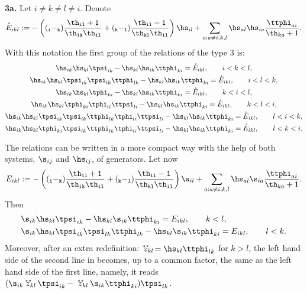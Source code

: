 {\bf 3a.} Let $i\neq k\neq l\neq i$. Denote
\begin{gather*}
\mathring{E}_{ikl}:=-\left((\tt_i-\tt_k) \frac{\th_{il}+1}{\th_{ik}\th_{il}}+(\tt_k-\tt_l) \frac{\th_{il}-1}{\th_{kl}\th_{il}}\right)\hs_{il}+\sum_{a:a\neq i,k,l}
\hs_{al}\hs_{ia} \frac{\ttphi_{ai}}{\th_{ka}+1} .
\end{gather*}
With this notation the f\/irst group of the relations of the type 3 is:
\begin{gather}\notag\hs_{ik}\hs_{kl}\tpsi_{ik} -\hs_{kl}\hs_{ik}\ttphi_{ki}
=\mathring{E}_{ikl} , \qquad i<k<l ,\\   \notag
\hs_{ik}\hs_{kl}\tpsi_{ik}\tpsi_{lk}\ttphi_{lk} -\hs_{kl}\hs_{ik}\ttphi_{ki}
=\mathring{E}_{ikl}  , \qquad i<l<k ,\\
\label{relation3}
\hs_{ik}\hs_{kl}\tphi_{ki} -\hs_{kl}\hs_{ik}\ttphi_{ki}=\mathring{E}_{ikl} , \qquad  k<i<l ,\\
\notag \hs_{ik}\hs_{kl}\tphi_{ki}\tphi_{li}\ttpsi_{li} -\hs_{kl}\hs_{ik}\ttphi_{ki}
=\mathring{E}_{ikl}  ,\qquad  k<l<i ,\\
\notag \hs_{ik}\hs_{kl}\tpsi_{ik}\tpsi_{lk}\ttphi_{lk}\tphi_{li}\ttpsi_{li}-\hs_{kl}\hs_{ik}\ttphi_{ki}
 =\mathring{E}_{ikl}  , \qquad l<i<k , \\  \notag
\hs_{ik}\hs_{kl}\tphi_{ki}\tpsi_{lk}\ttphi_{lk}\tphi_{li}\ttpsi_{li}
-\hs_{kl}\hs_{ik}\ttphi_{ki}=\mathring{E}_{ikl} , \qquad l<k<i .
\end{gather}

The relations  can be written in a more compact way with the help of both systems, $\s_{ij}$ and $\hs_{ij}$, of generators. Let now
\begin{gather*}
E_{ikl}:=-\left((\tt_i-\tt_k) \frac{\th_{il}+1}{\th_{ik}\th_{il}}+(\tt_k-\tt_l) \frac{\th_{il}-1}{\th_{kl}\th_{il}}\right)
\s_{il}+\sum_{a:a\neq i,k,l}
\hs_{al}\s_{ia} \frac{\ttphi_{ai}}{\th_{ka}+1} .
\end{gather*}
Then
\begin{gather}
\begin{split}
& \s_{ik}\hs_{kl}\tpsi_{ik} -\hs_{kl}\s_{ik}\ttphi_{ki}=E_{ikl} ,\qquad k<l,\\ %
& \s_{ik}\hs_{kl}\tpsi_{ik}\tpsi_{lk}\ttphi_{lk} -\hs_{kl}\s_{ik}\ttphi_{ki}=E_{ikl} ,\qquad l<k .
\end{split}
\label{shfo3a}
\end{gather}
Moreover, after an extra redef\/inition: $\!\mathring{\hspace{.1cm}z}_{kl}\!\!\!\!\!\!\mathring{\phantom{z}}\ =\hs_{kl}\ttphi_{lk}$ for $k>l$, the left hand side of the
second line in  becomes, up to a common factor, the same as the left hand side of the f\/irst line, namely, it reads $(\s_{ik}
\mathring{\hspace{.1cm}z}_{kl}\!\!\!\!\!\!\mathring{\phantom{z}}\ \ \tpsi_{ik} -\mathring{\hspace{.1cm}z}_{kl}\!\!\!\!\!\!\mathring{\phantom{z}}\ \ \s_{ik}\ttphi_{ki})
\tpsi_{lk}$.

